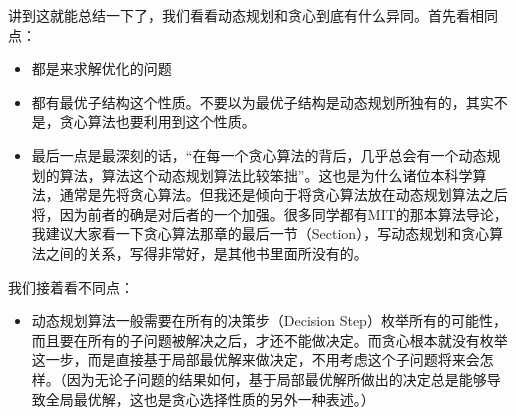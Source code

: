 	讲到这就能总结一下了，我们看看动态规划和贪心到底有什么异同。首先看相同点：
	\begin{itemize}
		\item
		都是来求解优化的问题
		\item
		都有最优子结构这个性质。不要以为最优子结构是动态规划所独有的，其实不是，贪心算法也要利用到这个性质。
		\item
		最后一点是最深刻的话，“在每一个贪心算法的背后，几乎总会有一个动态规划的算法，算法这个动态规划算法比较笨拙”。这也是为什么诸位本科学算法，通常是先将贪心算法。但我还是倾向于将贪心算法放在动态规划算法之后将，因为前者的确是对后者的一个加强。很多同学都有MIT的那本算法导论，我建议大家看一下贪心算法那章的最后一节（Section），写动态规划和贪心算法之间的关系，写得非常好，是其他书里面所没有的。
	\end{itemize}
	
	我们接着看不同点：
	\begin{itemize}
		\item
		动态规划算法一般需要在所有的决策步（Decision Step）枚举所有的可能性，而且要在所有的子问题被解决之后，才还不能做决定。而贪心根本就没有枚举这一步，而是直接基于局部最优解来做决定，不用考虑这个子问题将来会怎样。（因为无论子问题的结果如何，基于局部最优解所做出的决定总是能够导致全局最优解，这也是贪心选择性质的另外一种表述。）
	\end{itemize}
	
